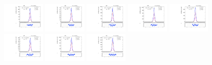 \begin{figure}[htb]
\ContinuedFloat
\centering
\includegraphics[width=0.19\textwidth]{plots/Appendix_Recoil_Fits/ZmmMC_PF_5TeV_2G/pfu1fit_0.pdf}
\includegraphics[width=0.19\textwidth]{plots/Appendix_Recoil_Fits/ZmmMC_PF_5TeV_2G/pfu1fit_1.pdf}
\includegraphics[width=0.19\textwidth]{plots/Appendix_Recoil_Fits/ZmmMC_PF_5TeV_2G/pfu1fit_2.pdf}
\includegraphics[width=0.19\textwidth]{plots/Appendix_Recoil_Fits/ZmmMC_PF_5TeV_2G/pfu1fit_3.pdf}
\includegraphics[width=0.19\textwidth]{plots/Appendix_Recoil_Fits/ZmmMC_PF_5TeV_2G/pfu1fit_4.pdf}
\includegraphics[width=0.19\textwidth]{plots/Appendix_Recoil_Fits/ZmmMC_PF_5TeV_2G/pfu1fit_5.pdf}
\includegraphics[width=0.19\textwidth]{plots/Appendix_Recoil_Fits/ZmmMC_PF_5TeV_2G/pfu1fit_6.pdf}
\includegraphics[width=0.19\textwidth]{plots/Appendix_Recoil_Fits/ZmmMC_PF_5TeV_2G/pfu1fit_7.pdf}

\end{figure}
